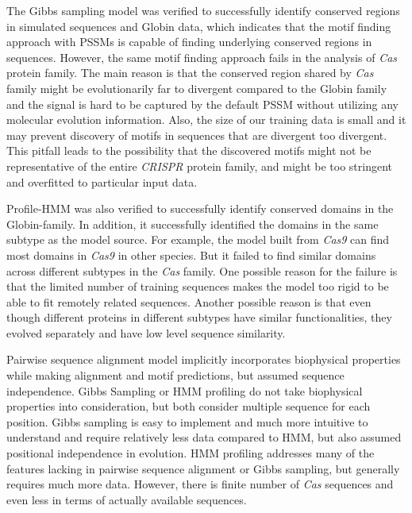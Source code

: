 \documentclass[11pt, oneside]{article}
\begin{document}
The Gibbs sampling model was verified to successfully identify conserved regions in simulated sequences and Globin data, which indicates that the motif finding approach with PSSMs is capable of finding underlying conserved regions in sequences. However, the same motif finding approach fails in the analysis of \textit{Cas} protein family. The main reason is that the conserved region shared by \textit{Cas} family might be evolutionarily far to divergent compared to the Globin family and the signal is hard to be captured by the default PSSM without utilizing any molecular evolution information. Also, the size of our training data is small and it may prevent discovery of motifs in sequences that are divergent too divergent. This pitfall leads to the possibility that the discovered motifs might not be representative of the entire \textit{CRISPR} protein family, and might be too stringent and overfitted to particular input data. 




Profile-HMM was also verified to successfully identify conserved domains in the Globin-family. In addition, it successfully identified the domains in the same subtype as the model source. For example, the model built from \textit{Cas9} can find most domains in \textit{Cas9} in other species. But it failed to find similar domains across different subtypes in the \textit{Cas} family. One possible reason for the failure is that the limited number of training sequences makes the model too rigid to be able to fit remotely related sequences. Another possible reason is that even though different proteins in different subtypes have similar functionalities, they evolved separately and have low level sequence similarity. 


Pairwise sequence alignment model implicitly incorporates biophysical properties while making alignment and motif predictions, but assumed sequence independence. Gibbs Sampling or HMM profiling do not take biophysical properties into consideration, but both consider multiple sequence for each position. Gibbs sampling is easy to implement and much more intuitive to understand and require relatively less data compared to HMM, but also assumed positional independence in evolution. HMM profiling addresses many of the features lacking in pairwise sequence alignment or Gibbs sampling, but generally requires much more data. However, there is finite number of \textit{Cas} sequences and even less in terms of actually available sequences. 
\end{document}
